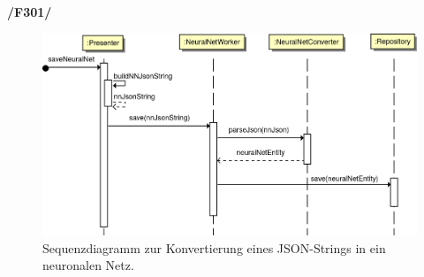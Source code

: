 \textbf{/F301/} 
\begin{figure}[H]
\begin{center}
\includegraphics[width=15cm]{Abbildungen/UML/jan/convertJsonNNSD.png}
\caption{Sequenzdiagramm zur Konvertierung eines JSON-Strings in ein neuronalen Netz.}
\label{fig_sdBackpropagation}
\end{center}
\end{figure}
